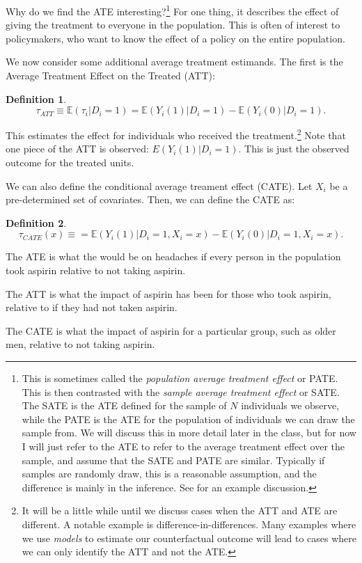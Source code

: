 \documentclass{tufte-handout}
\theoremstyle{break}
\newtheorem{defN}{Definition}
\newcommand{\continuation}{??}
\newenvironment{continueexample}[1]
 {\renewcommand{\continuation}{\ref{#1}}\excont[continued]}
 {\endexcont}
\newcommand{\E}{\mathbb{E}}
\begin{document}
Why do we find the ATE interesting?\footnote{This is sometimes called the \emph{population average treatment effect} or PATE. This is then contrasted with the \emph{sample average treatment effect} or SATE. The SATE is the ATE defined for the sample of $N$ individuals we observe, while the PATE is the ATE for the population of individuals we can draw the sample from. We will discuss this in more detail later in the class, but for now I will just refer to the ATE to refer to the average treatment effect over the  sample, and assume that the SATE and PATE are similar. Typically if samples are randomly draw, this is a reasonable assumption, and the difference is mainly in the inference. See \citet{imbens2004nonparametric} for an example discussion. } For one thing, it describes the effect of giving the treatment to everyone in the population. This is often of interest to policymakers, who want to know the effect of a policy on the entire population.

We now consider some additional average treatment estimands. The first is the Average Treatment Effect on the Treated (ATT):
\begin{defN}
  \begin{equation*}
    \tau_{ATT} \equiv \E(\tau_{i}| D_{i} = 1) = \E(Y_{i}(1) | D_{i} = 1) - \E(Y_{i}(0)| D_{i} = 1).
  \end{equation*}
\end{defN}
This estimates the effect for individuals who received the treatment.\footnote{It will be a little while until we discuss cases when the ATT and ATE are different. A notable example is difference-in-differences. Many examples where we use \emph{models} to estimate our counterfactual outcome will lead to cases where we can only identify the ATT and not the ATE.} Note that one piece of the ATT is observed: $E(Y_{i}(1) | D_{i} = 1)$. This is just the observed outcome for the treated units. 

We can also define the conditional average treament effect (CATE). Let $X_{i}$ be a pre-determined set of covariates. Then, we can define the CATE as:
\begin{defN}
  \begin{equation*}
    \tau_{CATE}(x) \equiv = \E(Y_{i}(1) | D_{i} = 1, X_{i} = x) - \E(Y_{i}(0)| D_{i} = 1, X_{i} = x).
  \end{equation*}
\end{defN}


\begin{boxD}
  \begin{continueexample}{example1}
    The ATE is what the would be on headaches if every person in the population took aspirin relative to not taking aspirin.

    The ATT is what the impact of aspirin has been for those who took aspirin, relative to if they had not taken aspirin.

    The CATE is what the impact of aspirin for a particular group, such as older men, relative to not taking aspirin.
    \end{continueexample}
  \end{boxD}
\end{document}

